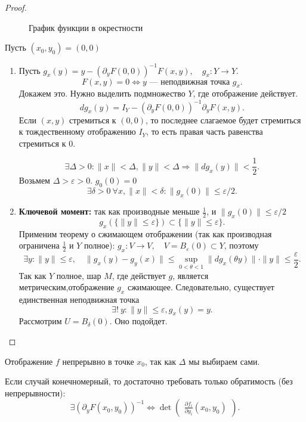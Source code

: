 \begin{proof}
\begin{figure}[ht]
    \centering
    \caption{График функции в окрестности}
    \label{fig:implicit-display}
\end{figure}
    Пусть $ (x_0, y_0) = (0, 0)$
    \begin{enumerate}[noitemsep]
	\item Пусть $ g_x (y) = y - \left( \partial _yF(0, 0) \right)^{-1}F(x, y) , \quad g_x\colon Y \to  Y $.
	    \[
		F(x, y) = 0 \Longleftrightarrow y \text{ --- неподвижная точка  } g_x
	    .\] 
	    Докажем это. Нужно выделить подмножество $ Y$, где отображение действует.
	     \[
		 d g_x(y) = I_Y - \left( \partial _yF(0, 0) \right)^{-1}\partial _y F(x, y)
	    .\] 
	    Если $ (x, y)$ стремиться к  $ (0, 0)$, то последнее слагаемое будет стремиться к тождественному отображению  $ I_Y$, то есть правая часть равенства стремиться к 0. 

	    \[
		\exists  \Delta > 0\colon \| x \|  < \Delta , \| y \| < \Delta  \Longrightarrow \| d g_{x}(y) \|  <\frac{1}{2}
	    .\] 
	    Возьмем $ \Delta > \varepsilon > 0$. $ g_0(0) = 0$
	     \[
		 \exists \delta >0 ~ \forall x , \|  x  \| < \delta \colon \| g_x(0) \| \le \varepsilon /2  
	    .\] 

	\item {\bf Ключевой момент:}  
	    так как производные меньше $ \frac{1}{2}$, и $ \|g_x(0)\| \le \varepsilon /2$
	    \[
		g_x\left(\{\| y \| \le \varepsilon  \}\right) \subset \{\| y \| \le \varepsilon  \}
	    .\] 
		Применим теорему о сжимающем отображении (так как производная ограничена $ \frac{1}{2}$ и $ Y$ полное): $ g_x\colon V \to  V, \quad V = B_{\varepsilon }(0) \subset Y$, поэтому 
	    \[
		 \exists y \colon \|  y \| \le \varepsilon, \quad	\| g_x(y) - g_y(x) \|  \le \sup_{0 < \theta < 1} \|  dg_x(\theta y) \| \cdot \| y \| \le  \frac{\varepsilon}{2}
	    .\] 
	    Так как $ Y$ полное, шар $ M$, где действует $ g$, является метрическим,отображение $ g_x$ сжимающее. Следовательно, существует единственная неподвижная точка
	     \[
		 \exists ! ~y\colon \| y \| \le \varepsilon ,   g_x(y) = y
	     .\] 
	     Рассмотрим $ U = B_{\delta }(0)$. Оно подойдет.
    \end{enumerate}
\end{proof}
\begin{note}
    Отображение $ f$ непрерывно в точке $ x_0$, так как $ \Delta $ мы выбираем сами.
\end{note}
\begin{note}
    Если случай конечномерный, то достаточно требовать только обратимость (без непрерывности):
	\[
		\exists \left( \partial _y F(x_0, y_0) \right)^{-1} \Longleftrightarrow \det 
		\begin{pmatrix}
			\frac{\partial f_i}{\partial y_i}(x_0, y_0)
		\end{pmatrix}
	.\] 
\end{note}
